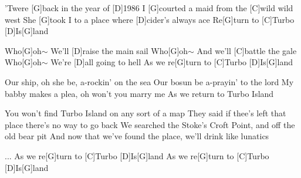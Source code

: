 

\begin{guitar}
	'Twere [G]back in the year of [D]1986
	I [G]courted a maid from the [C]wild wild west
	She [G]took I to a place where [D]cider's always ace
	Re[G]turn to [C]Turbo [D]Is[G]land
	
	Who[G]oh$\sim$ We'll [D]raise the main sail
	Who[G]oh$\sim$ And we'll [C]battle the gale
	Who[G]oh$\sim$ We're [D]all going to hell
	As we re[G]turn to [C]Turbo [D]Is[G]land
	
	Our ship, oh she be, a-rockin' on the sea
	Our bosun be a-prayin' to the lord
	My babby makes a plea, oh won't you marry me
	As we return to Turbo Island
	
	 
	
	You won't find Turbo Island on any sort of a map
	They said if thee's left that place there's no way to go back
	We searched the Stoke's Croft Point, and off the old bear pit
	And now that we've found the place, we'll drink like lunatics
	
	 
	... As we re[G]turn to [C]Turbo [D]Is[G]land
	As we re[G]turn to [C]Turbo [D]Is[G]land
	
\end{guitar}